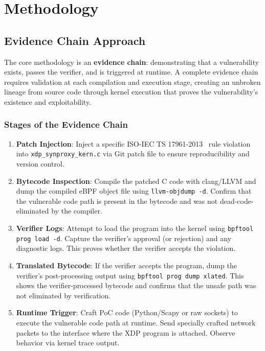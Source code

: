 \chapter{Methodology}

\section{Evidence Chain Approach}

The core methodology is an \textbf{evidence chain}: demonstrating that a vulnerability exists, passes the verifier, and is triggered at runtime. A complete evidence chain requires validation at each compilation and execution stage, creating an unbroken lineage from source code through kernel execution that proves the vulnerability's existence and exploitability.

\subsection{Stages of the Evidence Chain}

\begin{enumerate}[label=\arabic*.]
  \item \textbf{Patch Injection}: Inject a specific ISO-IEC TS 17961-2013~\cite{ISO17961} rule violation into \texttt{xdp\_synproxy\_kern.c} via Git patch file to ensure reproducibility and version control.
  
  \item \textbf{Bytecode Inspection}: Compile the patched C code with clang/LLVM and dump the compiled eBPF object file using \texttt{llvm-objdump -d}. Confirm that the vulnerable code path is present in the bytecode and was not dead-code-eliminated by the compiler.
  
  \item \textbf{Verifier Logs}: Attempt to load the program into the kernel using \texttt{bpftool prog load -d}. Capture the verifier's approval (or rejection) and any diagnostic logs. This proves whether the verifier accepts the violation.
  
  \item \textbf{Translated Bytecode}: If the verifier accepts the program, dump the verifier's post-processing output using \texttt{bpftool prog dump xlated}. This shows the verifier-processed bytecode and confirms that the unsafe path was not eliminated by verification.
  
  \item \textbf{Runtime Trigger}: Craft PoC code (Python/Scapy or raw sockets) to execute the vulnerable code path at runtime. Send specially crafted network packets to the interface where the XDP program is attached. Observe behavior via kernel trace output.
\end{enumerate}

